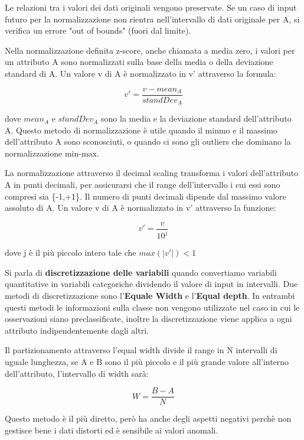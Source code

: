 \documentclass[a4paper]{extarticle}
\begin{document}
Le relazioni tra i valori dei dati originali vengono preservate. Se un caso di input futuro per la normalizzazione non rientra nell'intervallo di dati originale per A, si verifica un errore "out of bounds" (fuori dal limite).

Nella normalizzazione definita z-score, anche chiamata a media zero, i valori per un attributo A sono normalizzati sulla base della media o della deviazione standard di A. Un valore v di A è normalizzato in v' attraverso la formula:

\begin{equation}
v'=\frac{v-mean_A}{standDev_A}
\end{equation}

dove $mean_A$ e $standDev_A$ sono la media e la deviazione standard dell'attributo A. Questo metodo di normalizzazione è utile quando il minmo e il massimo dell'attributo A sono sconosciuti, o quando ci sono gli outliers che dominano la normalizzazione min-max.

La normalizzazione attraverso il decimal scaling transforma i valori dell'attributo A in punti decimali, per assicurarsi che il range dell'intervallo i cui essi sono compresi sia \{-1,+1\}. Il numero di punti decimali dipende dal massimo valore assoluto di A. Un valore v di A è normalizzato in v' attraverso la funzione:

\begin{equation}
v'= \frac{v}{10^j}
\end{equation}

dove j è il più piccolo intero tale che $max(|v'|)<1$

Si parla di \textbf{discretizzazione delle variabili} quando convertiamo variabili quantitative in variabili categoriche dividendo il valore di input in intervalli. Due metodi di discretizzazione sono l'\textbf{Equale Width} e l'\textbf{Equal depth}. In entrambi questi metodi le informazioni sulla classe non vengono utilizzate nel caso in cui le osservazioni siano preclassificate, inoltre la discretizzazione viene applica a ogni attributo indipendentemente dagli altri. 

Il partizionamento attraverso l'equal width divide il range in N intervalli di uguale lunghezza, se A e B sono il più piccolo e il più grande valore all'interno dell'attributo, l'intervallo di width sarà:

\begin{equation}
W=\frac{B-A}{N}
\end{equation}

Questo metodo è il più diretto, però ha anche degli aspetti negativi perchè non gestisce bene i dati distorti ed è sensibile ai valori anomali.
\end{document}
